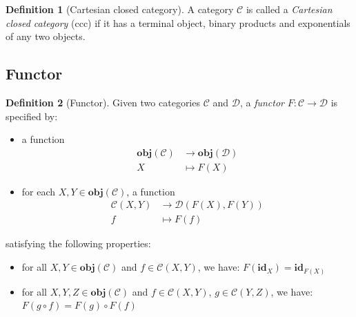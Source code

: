 \documentclass[12pt,twoside,a4paper]{report}
\theoremstyle{definition}
\newtheorem{definition}{Definition}
\theoremstyle{definition}
\theoremstyle{definition}
\theoremstyle{definition}
\begin{document}
        \begin{definition}[Cartesian closed category]
            A category $\mathcal{C}$ is called a \emph{Cartesian closed category} (ccc) if it has a terminal object, binary products and exponentials of any two objects.
        \end{definition}

        
        \subsection{Functor}
        \begin{definition}[Functor]
            Given two categories $\mathcal{C}$ and $\mathcal{D}$, a \emph{functor} $F: \mathcal{C} \to \mathcal{D}$ is specified by:
            \begin{itemize}
                \item 
                    a function 
                    \[\begin{aligned}
                        \textbf{obj}(\mathcal{C}) &\to \textbf{obj}(\mathcal{D}) \\
                        X &\mapsto F(X)
                    \end{aligned}\]

                \item 
                    for each $X, Y \in \textbf{obj}(\mathcal{C})$, a function 
                    \[\begin{aligned}
                        \mathcal{C}{(X,Y)} &\to \mathcal{D}{(F(X),F(Y))} \\
                        f &\mapsto F(f)
                    \end{aligned}\]
            \end{itemize}
            satisfying the following properties:
            \begin{itemize}
                \item 
                    for all $X, Y \in \textbf{obj}(\mathcal{C})$ and $f \in \mathcal{C}{(X,Y)}$, we have: $ F(\textbf{id}_X) = \textbf{id}_{F(X)}$
                \item
                    for all $X, Y, Z \in \textbf{obj}(\mathcal{C})$ and $f \in \mathcal{C}{(X,Y)}$, $g \in \mathcal{C}{(Y,Z)}$, we have: $F(g \circ f) = F(g) \circ F(f)$
            \end{itemize}
        \end{definition}

        
\end{document}
